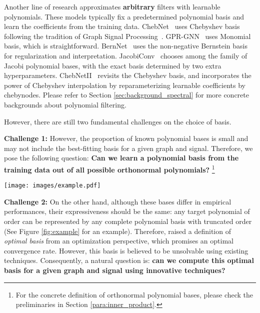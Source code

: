 Another line of research approximates \textbf{arbitrary} filters with learnable polynomials. These models typically fix a predetermined polynomial basis and learn the coefficients from the training data. 
ChebNet~\cite{Defferrard2016cheb} uses Chebyshev basis following the tradition of Graph Signal Processing~\cite{Hammond2009}. 
GPR-GNN~\cite{chien2021gprgnn} uses Monomial basis, which is straightforward.
BernNet~\cite{He2021bern} uses the non-negative Bernstein basis for regularization and interpretation.
JacobiConv~\cite{Wang2022jacobi} chooses among the family of Jacobi polynomial bases, 
with the exact basis determined by two extra hyperparameters. 
ChebNetII~\cite{he2022chebii} revisits the Chebyshev basis, 
and incorporates the power of Chebyshev interpolation
 by reparameterizing learnable coefficients by chebynodes.   
Please refer to Section \ref{sec:background_spectral} for more concrete backgrounds about polynomial filtering.   

However, there are still two fundamental challenges on the choice of basis. 

\textbf{Challenge 1: }
However, the proportion of known polynomial bases is small and may not include the best-fitting basis for a given graph and signal. Therefore, we pose the following question: \textbf{Can we learn a polynomial basis from the training data out of all possible orthonormal polynomials?}
\footnote{For the concrete definition of orthonormal polynomial bases, 
please check the preliminaries in Section \ref{para:inner_product}.}






\begin{figure*}
    \centering
    \texttt{[image: images/example.pdf]}
    \caption{Representation of  by 
       different bases.}
    \label{fig:example}
 \end{figure*}

\textbf{Challenge 2: }
On the other hand, although these bases differ in empirical performances, their expressiveness should be the same:
any target polynomial of order  can be represented by 
any complete polynomial basis with truncated order  (See Figure \ref{fig:example} for an example). 
Therefore, \citet{Wang2022jacobi} raised a definition of \textit{optimal basis} from an optimization perspective,   
which promises an optimal convergence rate. 
However, this basis is believed to be unsolvable using existing techniques. Consequently, a natural question is: \textbf{can we compute this optimal basis for a given graph and signal using innovative techniques?}





